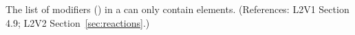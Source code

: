 The list of modifiers () in a \KineticLaw can only
contain  elements.  (References: L2V1
Section 4.9; L2V2 Section~\ref{sec:reactions}.)
